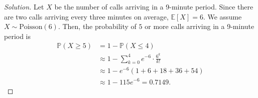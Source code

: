 \documentclass[addpoints, 11pt]{exam}
\newcommand*{\prob}{\mathds{P}}
\newcommand*{\E}{\mathds{E}}
\begin{document}
\begin{proof}[Solution]
    Let $X$ be the number of calls arriving in a 9-minute period. Since there are two calls arriving every three minutes on average, $\E[X] = 6$. We assume $X \sim \text{Poisson}(6)$. Then,
    the probability of $5$ or more calls arriving in a 9-minute period is
    \begin{align*}
        \prob(X \geq 5)
        &= 1 - \prob(X \leq 4) \\
        &\approx 1 - \sum_{k = 0}^{4} e^{-6} \cdot \frac{6^k}{k!} \\
        &\approx 1 - e^{-6}\left(1 + 6 + 18 + 36 + 54\right) \\
        &\approx 1 - 115e^{-6} = 0.7149.
    \end{align*}
\end{proof}
\end{document}

